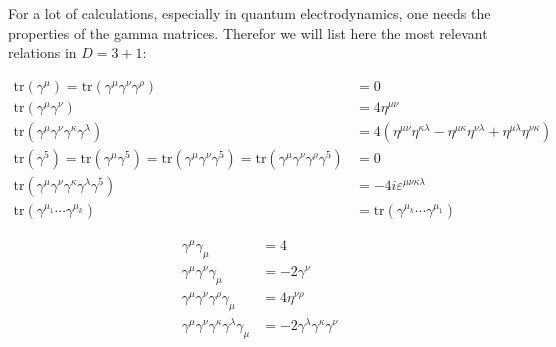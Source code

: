 	For a lot of calculations, especially in quantum electrodynamics, one needs the properties of the gamma matrices. Therefor we will list here the most relevant relations in $D=3+1$:
	\begin{formula}
		\begin{align}
			\text{tr}(\gamma^\mu) = \text{tr}(\gamma^\mu\gamma^\nu\gamma^\rho) &= 0\\
			\text{tr}(\gamma^\mu\gamma^\nu) &= 4\eta^{\mu\nu}\\
			\text{tr}(\gamma^\mu\gamma^\nu\gamma^\kappa\gamma^\lambda) &= 4(\eta^{\mu\nu}\eta^{\kappa\lambda} - \eta^{\mu\kappa}\eta^{\nu\lambda} + \eta^{\mu\lambda}\eta^{\nu\kappa})\\
			\text{tr}(\gamma^5) = \text{tr}(\gamma^\mu\gamma^5) = \text{tr}(\gamma^\mu\gamma^\nu\gamma^5) = \text{tr}(\gamma^\mu\gamma^\nu\gamma^\rho\gamma^5)&= 0\\
			\text{tr}(\gamma^\mu\gamma^\nu\gamma^\kappa\gamma^\lambda\gamma^5) &= -4i\varepsilon^{\mu\nu\kappa\lambda}\\
			\text{tr}(\gamma^{\mu_1}\cdots\gamma^{\mu_k}) &= \text{tr}(\gamma^{\mu_k}\cdots\gamma^{\mu_1})
		\end{align}
	\end{formula}
	
	\begin{formula}
		\begin{align}
			\gamma^\mu\gamma_\mu &= 4\\
			\gamma^\mu\gamma^\nu\gamma_\mu &= -2\gamma^\nu\\
			\gamma^\mu\gamma^\nu\gamma^\rho\gamma_\mu &= 4\eta^{\nu\rho}\\
			\gamma^\mu\gamma^\nu\gamma^\kappa\gamma^\lambda\gamma_\mu &= -2\gamma^\lambda\gamma^\kappa\gamma^\nu\\
		\end{align}
	\end{formula}
